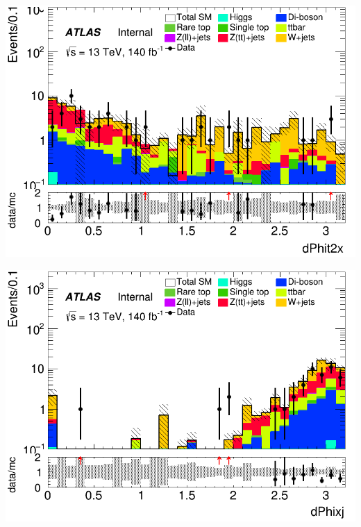 \documentclass[usenames,dvipsnames]{beamer}
\begin{document}
\begin{frame}
    \begin{minipage}{0.32\textwidth}
        \centering
        \includegraphics[width=\textwidth]{graphics/HHH_met/HHH_met_dPhit2x.png}
    \end{minipage}
    \hfill
    \begin{minipage}{0.32\textwidth}
        \centering
        \includegraphics[width=\textwidth]{graphics/HHH_met/HHH_met_dPhixj.png}
    \end{minipage}
    \hfill
    \begin{minipage}{0.32\textwidth}
        \centering

\end{minipage}
\end{frame}
\end{document}
